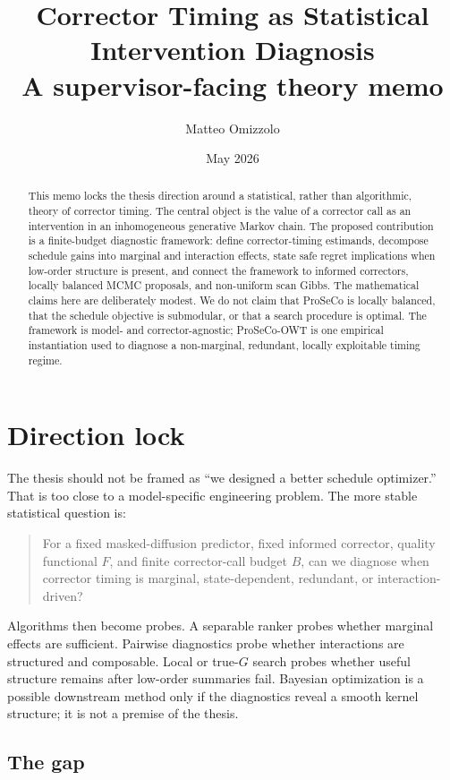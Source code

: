 \documentclass[11pt]{article}
\title{\vspace{-1.5em}Corrector Timing as Statistical Intervention Diagnosis\\
\large A supervisor-facing theory memo}
\author{Matteo Omizzolo}
\date{May 2026}
\newcommand{\1}{\mathbf 1}
\begin{document}
\maketitle

\begin{abstract}
This memo locks the thesis direction around a statistical, rather than
algorithmic, theory of corrector timing.  The central object is the value of a
corrector call as an intervention in an inhomogeneous generative Markov chain.
The proposed contribution is a finite-budget diagnostic framework: define
corrector-timing estimands, decompose schedule gains into marginal and
interaction effects, state safe regret implications when low-order structure is
present, and connect the framework to informed correctors, locally balanced
MCMC proposals, and non-uniform scan Gibbs.  The mathematical claims here are
deliberately modest.  We do not claim that ProSeCo is locally balanced, that the
schedule objective is submodular, or that a search procedure is optimal.  The
framework is model- and corrector-agnostic; ProSeCo-OWT is one empirical
instantiation used to diagnose a non-marginal, redundant, locally exploitable
timing regime.
\end{abstract}

\section{Direction lock}

The thesis should not be framed as ``we designed a better schedule optimizer.''
That is too close to a model-specific engineering problem.  The more stable
statistical question is:

\begin{quote}
For a fixed masked-diffusion predictor, fixed informed corrector, quality
functional \(F\), and finite corrector-call budget \(B\), can we diagnose when
corrector timing is marginal, state-dependent, redundant, or interaction-driven?
\end{quote}

Algorithms then become probes.  A separable ranker probes whether marginal
effects are sufficient.  Pairwise diagnostics probe whether interactions are
structured and composable.  Local or true-\(G\) search probes whether useful
structure remains after low-order summaries fail.  Bayesian optimization is a
possible downstream method only if the diagnostics reveal a smooth kernel
structure; it is not a premise of the thesis.

\subsection{The gap}
\end{document}
